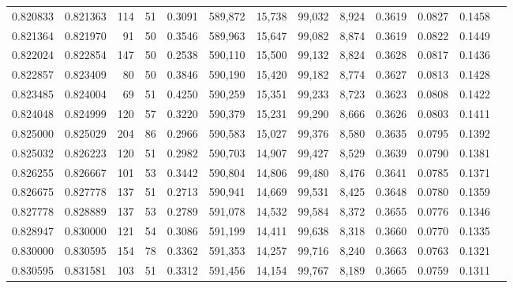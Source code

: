 \begin{tabular}{rrrrrrrrrrrrr}
0.820833 & 0.821363 &    114 &    51 &                                     0.3091 & 589,872 &  15,738 &  99,032 &   8,924 & 0.3619 & 0.0827 & 0.1458 \\
0.821364 & 0.821970 &     91 &    50 &                                     0.3546 & 589,963 &  15,647 &  99,082 &   8,874 & 0.3619 & 0.0822 & 0.1449 \\
0.822024 & 0.822854 &    147 &    50 &                                     0.2538 & 590,110 &  15,500 &  99,132 &   8,824 & 0.3628 & 0.0817 & 0.1436 \\
0.822857 & 0.823409 &     80 &    50 &                                     0.3846 & 590,190 &  15,420 &  99,182 &   8,774 & 0.3627 & 0.0813 & 0.1428 \\
0.823485 & 0.824004 &     69 &    51 &                                     0.4250 & 590,259 &  15,351 &  99,233 &   8,723 & 0.3623 & 0.0808 & 0.1422 \\
0.824048 & 0.824999 &    120 &    57 &                                     0.3220 & 590,379 &  15,231 &  99,290 &   8,666 & 0.3626 & 0.0803 & 0.1411 \\
0.825000 & 0.825029 &    204 &    86 &                                     0.2966 & 590,583 &  15,027 &  99,376 &   8,580 & 0.3635 & 0.0795 & 0.1392 \\
0.825032 & 0.826223 &    120 &    51 &                                     0.2982 & 590,703 &  14,907 &  99,427 &   8,529 & 0.3639 & 0.0790 & 0.1381 \\
0.826255 & 0.826667 &    101 &    53 &                                     0.3442 & 590,804 &  14,806 &  99,480 &   8,476 & 0.3641 & 0.0785 & 0.1371 \\
0.826675 & 0.827778 &    137 &    51 &                                     0.2713 & 590,941 &  14,669 &  99,531 &   8,425 & 0.3648 & 0.0780 & 0.1359 \\
0.827778 & 0.828889 &    137 &    53 &                                     0.2789 & 591,078 &  14,532 &  99,584 &   8,372 & 0.3655 & 0.0776 & 0.1346 \\
0.828947 & 0.830000 &    121 &    54 &                                     0.3086 & 591,199 &  14,411 &  99,638 &   8,318 & 0.3660 & 0.0770 & 0.1335 \\
0.830000 & 0.830595 &    154 &    78 &                                     0.3362 & 591,353 &  14,257 &  99,716 &   8,240 & 0.3663 & 0.0763 & 0.1321 \\
0.830595 & 0.831581 &    103 &    51 &                                     0.3312 & 591,456 &  14,154 &  99,767 &   8,189 & 0.3665 & 0.0759 & 0.1311 \\

\end{tabular}
